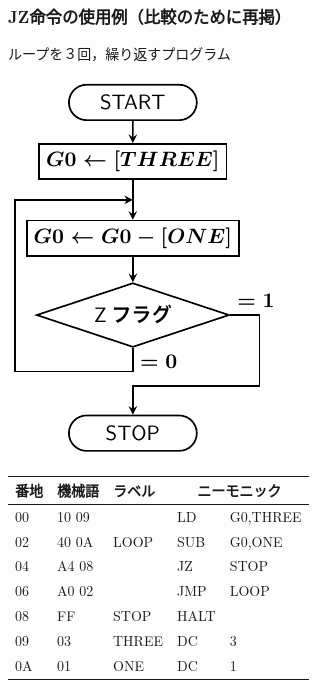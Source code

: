 \documentclass[handout]{beamer}        %
\begin{document}
\begin{frame}
  \frametitle{JZ命令の使用例（比較のために再掲）}
  ループを３回，繰り返すプログラム\\
  \vfill
  \begin{minipage}{0.4\columnwidth}
    \centerline{\includegraphics[scale=0.7]{../Tikz/flow0B.pdf}}
  \end{minipage}
  \begin{minipage}{0.59\columnwidth}
    {\ttfamily\small\begin{center}
      \begin{tabular}{|l|l|l|l l|} \hline
        番地 & 機械語 & ラベル & \multicolumn{2}{|c|}{ニーモニック} \\
        \hline
        00 & 10 09 &           & LD   & G0,THREE              \\
        02 & 40 0A &  LOOP     & SUB  & G0,ONE                \\
        04 & A4 08 &           & JZ   & STOP                  \\
        06 & A0 02 &           & JMP  & LOOP                  \\
        08 & FF    &  STOP     & HALT &                       \\
        09 & 03    &  THREE    & DC   & 3                     \\
        0A & 01    &  ONE      & DC   & 1                     \\
        \hline
      \end{tabular}
    \end{center}}
  \end{minipage}
  \vfill
\end{frame}
\end{document}
